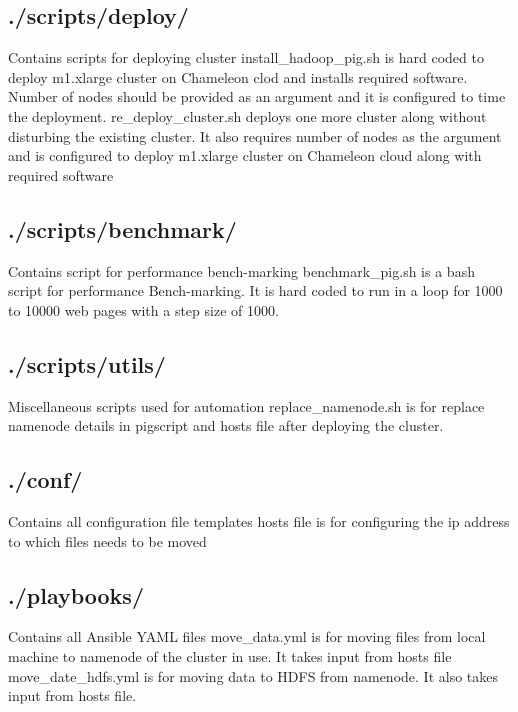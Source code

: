 \documentclass[9pt,twocolumn,twoside]{../../styles/osajnl}
\begin{document}
\subsection{./scripts/deploy/} Contains scripts for deploying cluster
\newline install\_hadoop\_pig.sh is hard coded to deploy m1.xlarge cluster on Chameleon clod and installs required software. Number of nodes should be provided as an argument and it is configured to time the deployment.
\newline re\_deploy\_cluster.sh deploys one more cluster along without disturbing the existing cluster. It also requires number of nodes as the argument and is configured to deploy m1.xlarge cluster on Chameleon cloud along with required software
\subsection{./scripts/benchmark/} Contains script for performance bench-marking
\newline benchmark\_pig.sh is a bash script for performance Bench-marking. It is hard coded to run in a loop for 1000 to 10000 web pages with a step size of 1000.
\subsection{./scripts/utils/} Miscellaneous scripts used for automation
\newline replace\_namenode.sh is for replace namenode details in pigscript and hosts file after deploying the cluster. 
\subsection{./conf/} Contains all configuration file templates
\newline hosts file is for configuring the ip address to which files needs to be moved
\subsection{./playbooks/} Contains all Ansible YAML files
\newline move\_data.yml is for moving files from local machine to namenode of the cluster in use. It takes input from hosts file
\newline move\_date\_hdfs.yml is for moving data to HDFS from namenode. It also takes input from hosts file.
\end{document}

